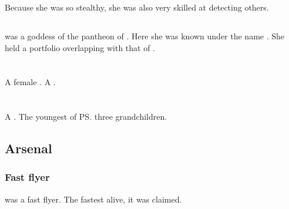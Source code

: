 Because she was so stealthy, she was also very skilled at detecting others.









\subsection{\Usherain}
\Nzessuacrith was a goddess of the  pantheon of . 
Here she was known under the name \Usherain. 
She held a portfolio overlapping with that of . 















\section{\Laccashyth}
A female \dragon. 
A \shaeeroth. 














\section{\Rathyon}
\index{\Rathyon}
A \dragon. 
The youngest of \ps{\QuessanthIshnaruchaefir} three grandchildren. 









\subsection{Arsenal}
\subsubsection{Fast flyer}
\Rathyon{} was a fast flyer. 
The fastest \dragon{} alive, it was claimed. 









